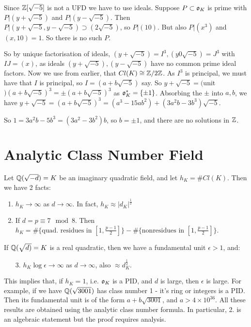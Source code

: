 \documentclass[10pt,a4paper]{article}
\begin{document}
Since $\mathbb{Z}[\sqrt{-5}]$ is not a UFD we have to use ideals. Suppose $P \subset \mathfrak{o}_K$ is prime with $P |(y+\sqrt{-5})$ and $P|(y-\sqrt{-5})$. Then $P | (y+\sqrt{-5}, y-\sqrt{-5}) \supset (2\sqrt{-5})$, so $P |(10)$. But also $P|(x^3)$ and $(x,10) = 1$. So there is no such $P$.

So by unique factorisation of ideals, $(y+\sqrt{-5}) = I^3, (y0\sqrt{-5}) = J^3$ with $IJ = (x)$, as ideals $(y+\sqrt{-5}), (y-\sqrt{-5})$ have no common prime ideal factors. Now we use from earlier, that $Cl(K) \cong \mathbb{Z}/2\mathbb{Z}$. As $I^3$ is principal, we must have that $I$ is principal, so $I = (a+b\sqrt{-5})$ say. So $y+\sqrt{-5} = ($unit$)(a+b\sqrt{-5})^3 = \pm(a+b\sqrt{-5})^3$ as $\mathfrak{o}_K^\ast = \{\pm 1\}$. Absorbing the $\pm$ into $a,b$, we have $y+\sqrt{-5} = (a+b\sqrt{-5})^3 = (a^3 - 15ab^2) + (3a^2b-3b^3)\sqrt{-5}$.

So $1 = 3a^2b - 5b^3 = (3a^2-3b^2)b$, so $b = \pm 1$, and there are no solutions in $\mathbb{Z}$.
\section{Analytic Class Number Field}
Let $\mathbb{Q}(\sqrt{-d}) = K$ be an imaginary quadratic field, and let $h_K = \#Cl(K)$. Then we have 2 facts:
\begin{enumerate}
\item $h_K \to \infty$ as $d \to \infty$. In fact, $h_K \approx |d_K|^{\frac12}$
\item If $d = p \equiv 7 \mod 8$. Then $h_K = \#\{\text{quad. residues in }[1, \frac{p-1}{2}]\} - \#\{\text{nonresidues in }[1,\frac{p-1}{2}]\}$.
\end{enumerate}
If $\mathbb{Q}(\sqrt{d)} = K$ is a real quadratic, then we have a fundamental unit $\epsilon > 1$, and:
\begin{enumerate}
\item[3.] $h_K \log \epsilon \to \infty$ as $d \to \infty$, also $\approx d_K^\frac12$.
\end{enumerate}
This implies that, if $h_K = 1$, i.e. $\mathfrak{o}_K$ is a PID, and $d$ is large, then $\epsilon$ is large. For example, if we have $\mathbb{Q}(\sqrt{3001})$ has class number 1 - it's ring or integers is a PID. Then its fundamental unit is of the form $a+b\sqrt{3001}$, and $a > 4\times 10^{36}$. All these results are obtained using the analytic class number formula. In particular, 2. is an algebraic statement but the proof requires analysis.
\end{document}
